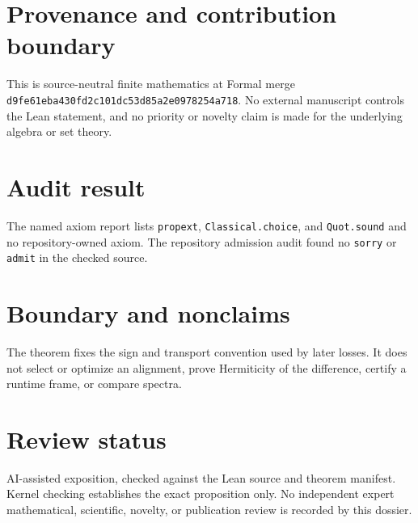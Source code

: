 \documentclass[11pt]{article}
\begin{document}
\section{Provenance and contribution boundary}
This is source-neutral finite mathematics at Formal merge
\texttt{d9fe61eba430fd2c101dc53d85a2e0978254a718}.  No external manuscript controls the Lean statement, and no priority or
novelty claim is made for the underlying algebra or set theory.

\section{Audit result}
The named axiom report lists \texttt{propext}, \texttt{Classical.choice}, and
\texttt{Quot.sound} and no repository-owned axiom.  The repository admission audit found no
\texttt{sorry} or \texttt{admit} in the checked source.

\section{Boundary and nonclaims}
The theorem fixes the sign and transport convention used by later losses.  It does not select or optimize an alignment, prove Hermiticity of the difference, certify a runtime frame, or compare spectra.

\section{Review status}
AI-assisted exposition, checked against the Lean source and theorem manifest.  Kernel checking
establishes the exact proposition only.  No independent expert mathematical, scientific,
novelty, or publication review is recorded by this dossier.
\end{document}
